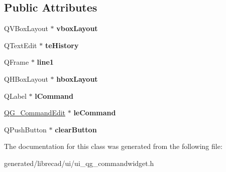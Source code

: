 \subsection*{Public Attributes}
\begin{DoxyCompactItemize}
\item 
\hypertarget{classUi__QG__CommandWidget_abd6f788154a9e3a42724668cba81d89b}{Q\-V\-Box\-Layout $\ast$ {\bfseries vbox\-Layout}}\label{classUi__QG__CommandWidget_abd6f788154a9e3a42724668cba81d89b}

\item 
\hypertarget{classUi__QG__CommandWidget_a2dc2e7c2e0a8392540e3d6eee17ab7b7}{Q\-Text\-Edit $\ast$ {\bfseries te\-History}}\label{classUi__QG__CommandWidget_a2dc2e7c2e0a8392540e3d6eee17ab7b7}

\item 
\hypertarget{classUi__QG__CommandWidget_aeb43c3850354f6bf123b3e5a4b49aa1d}{Q\-Frame $\ast$ {\bfseries line1}}\label{classUi__QG__CommandWidget_aeb43c3850354f6bf123b3e5a4b49aa1d}

\item 
\hypertarget{classUi__QG__CommandWidget_a90f45afb55ca4d57a521e26389ebb3ec}{Q\-H\-Box\-Layout $\ast$ {\bfseries hbox\-Layout}}\label{classUi__QG__CommandWidget_a90f45afb55ca4d57a521e26389ebb3ec}

\item 
\hypertarget{classUi__QG__CommandWidget_ab0a43a950df1e0774650f87154a93c93}{Q\-Label $\ast$ {\bfseries l\-Command}}\label{classUi__QG__CommandWidget_ab0a43a950df1e0774650f87154a93c93}

\item 
\hypertarget{classUi__QG__CommandWidget_af636edbbe9e27eaa0c651444ff4ced85}{\hyperlink{classQG__CommandEdit}{Q\-G\-\_\-\-Command\-Edit} $\ast$ {\bfseries le\-Command}}\label{classUi__QG__CommandWidget_af636edbbe9e27eaa0c651444ff4ced85}

\item 
\hypertarget{classUi__QG__CommandWidget_a3e904caa31264ca3beeee3807f385402}{Q\-Push\-Button $\ast$ {\bfseries clear\-Button}}\label{classUi__QG__CommandWidget_a3e904caa31264ca3beeee3807f385402}

\end{DoxyCompactItemize}


The documentation for this class was generated from the following file\-:\begin{DoxyCompactItemize}
\item 
generated/librecad/ui/ui\-\_\-qg\-\_\-commandwidget.\-h\end{DoxyCompactItemize}
